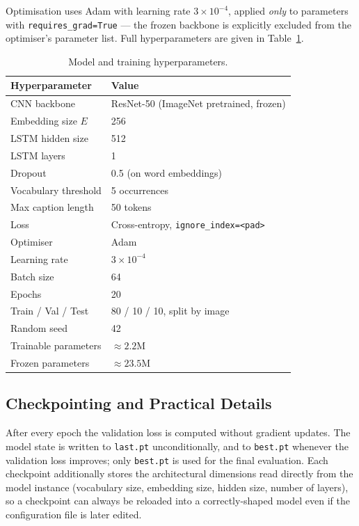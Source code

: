 \documentclass{article}
\begin{document}
Optimisation uses Adam \citep{kingma2014adam} with learning rate
$3 \times 10^{-4}$, applied \emph{only} to parameters with
\texttt{requires\_grad=True} --- the frozen backbone is explicitly excluded from
the optimiser's parameter list. Full hyperparameters are given in
Table~\ref{tab:hyperparams}.

\begin{table}[h]
  \caption{Model and training hyperparameters.}
  \label{tab:hyperparams}
  \centering
  \begin{tabular}{ll}
    \toprule
    Hyperparameter & Value \\
    \midrule
    CNN backbone            & ResNet-50 (ImageNet pretrained, frozen) \\
    Embedding size $E$      & 256 \\
    LSTM hidden size        & 512 \\
    LSTM layers             & 1 \\
    Dropout                 & 0.5 (on word embeddings) \\
    Vocabulary threshold    & 5 occurrences \\
    Max caption length      & 50 tokens \\
    \midrule
    Loss                    & Cross-entropy, \texttt{ignore\_index=<pad>} \\
    Optimiser               & Adam \\
    Learning rate           & $3 \times 10^{-4}$ \\
    Batch size              & 64 \\
    Epochs                  & 20 \\
    \midrule
    Train / Val / Test      & 80 / 10 / 10, split by image \\
    Random seed             & 42 \\
    Trainable parameters    & $\approx 2.2$M \\
    Frozen parameters       & $\approx 23.5$M \\
    \bottomrule
  \end{tabular}
\end{table}

\subsection{Checkpointing and Practical Details}

After every epoch the validation loss is computed without gradient updates. The
model state is written to \texttt{last.pt} unconditionally, and to
\texttt{best.pt} whenever the validation loss improves; only \texttt{best.pt} is
used for the final evaluation. Each checkpoint additionally stores the
architectural dimensions read directly from the model instance (vocabulary size,
embedding size, hidden size, number of layers), so a checkpoint can always be
reloaded into a correctly-shaped model even if the configuration file is later
edited.
\end{document}
